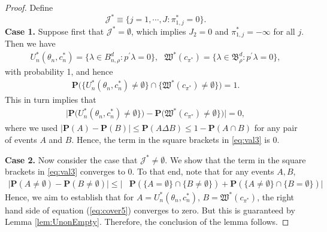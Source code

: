 \documentclass[letterpaper,11pt]{article}
\theoremstyle{myplain}
\theoremstyle{mydefinition}
\theoremstyle{myremark}
\newcommand{\cJ}{\mathcal{J}}
\numberwithin{equation}{section}
\numberwithin{figure}{section}
\begin{document}
\begin{appendices}
\begin{proof}
 Define 
 \begin{equation}
 \label{eq:Jstar}
\mathcal J^*\equiv\{j=1,\cdots,J:\pi^*_{1,j}=0\} .
 \end{equation}
\noindent \textbf{Case 1.} Suppose first that $\mathcal J^*= \emptyset$, which implies $J_2=0$ and $\pi^*_{1,j}=-\infty$ for all $j.$
Then we have
\begin{align}
U^*_{n}(\theta_{n},c^{*}_{n})=\{\lambda \in  B^d_{n,\rho}:p^\prime\lambda =0\},~~~	\mathfrak{W}^*(c_{\pi^*})=\{\lambda \in  \mathfrak B^d_\rho:p^\prime\lambda =0\},
\end{align}
with probability 1, and hence 
\begin{align}
	\mathbf{P}\Big( \{U^*_{n}(\theta_{n},c^{*}_{n})\neq \emptyset \} \cap \{ \mathfrak{W}^*(c_{\pi^*})\neq \emptyset\}  \Big)=1.\label{eq:val9}
\end{align}
This in turn implies that
\begin{align}
 \Big| \mathbf{P}\Big(U^*_{n}(\theta_{n},c^{*}_{n})\neq \emptyset \} \Big)
- \mathbf{P}\Big(\mathfrak{W}^*(c_{\pi^*})\neq \emptyset\} \Big)\Big|=0,\label{eq:val10}
\end{align}
where we used $|\mathbf P(A)-\mathbf P(B)|\le \mathbf P(A\Delta B)\le 1-\mathbf P(A\cap B)$ for any pair of events $A$ and $B.$ Hence, the term in the square brackets in \eqref{eq:val3} is 0.

\noindent \textbf{Case 2.} Now consider the case that $\cJ^*\neq \emptyset$. We show that the term in  the square brackets in \eqref{eq:val3} converges to 0.
To that end, note that for any events $A,B$,
\begin{align}
\Big\vert\mathbf{P}(A\neq \emptyset) - \mathbf{P}(B\neq \emptyset)  \Big\vert
\le \Big\vert &\mathbf{P}(\{A= \emptyset \} \cap \{ B \neq \emptyset\})+
\mathbf{P}(\{A\neq \emptyset \} \cap \{ B =\emptyset\})\Big\vert \label{eq:cover5}
\end{align}
Hence, we aim to establish that for $A=U^*_{n}(\theta_{n},c^{*}_{n})$, $B= \mathfrak{W}^*(c_{\pi^*})$, the right hand side of equation (\ref{eq:cover5}) converges to zero. But this is guaranteed by Lemma \ref{lem:UnonEmpty}. 
Therefore, the conclusion of the lemma follows.
\end{proof}


\end{appendices}
\end{document}
